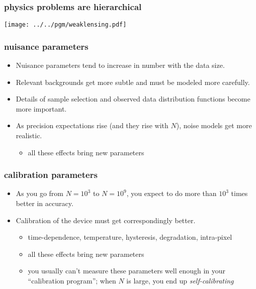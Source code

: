 \documentclass[pdftex]{beamer}
\begin{document}
\begin{frame}
  \frametitle{physics problems are hierarchical}
  \texttt{[image: ../../pgm/weaklensing.pdf]}
\end{frame}

\begin{frame}
  \frametitle{nuisance parameters}
  \begin{itemize}
  \item Nuisance parameters tend to increase in number with the data size.
  \item Relevant backgrounds get more subtle and must be modeled more carefully.
  \item Details of sample selection and observed data distribution functions become more important.
  \item As precision expectations rise (and they rise with $N$), noise models get more realistic.
    \begin{itemize}
    \item all these effects bring new parameters
    \end{itemize}
  \end{itemize}
\end{frame}

\begin{frame}
  \frametitle{calibration parameters}
  \begin{itemize}
  \item As you go from $N=10^3$ to $N=10^9$, you expect to do more than $10^3$ times better in accuracy.
  \item Calibration of the device must get correspondingly better.
    \begin{itemize}
    \item time-dependence, temperature, hysteresis, degradation, intra-pixel
    \item all these effects bring new parameters
    \item you usually can't measure these parameters well enough in your ``calibration program''; when $N$ is large, you end up \emph{self-calibrating}
    \end{itemize}
  \end{itemize}
\end{frame}
\end{document}
